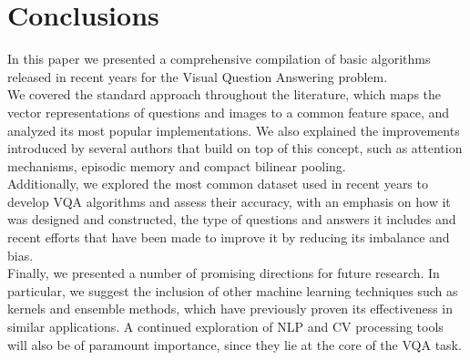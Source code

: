 \documentclass{article}
\begin{document}
\section{Conclusions}\label{conclusions}
In this paper we presented a comprehensive compilation of basic algorithms released in recent years for the Visual Question Answering problem.\\
We covered the standard approach throughout the literature, which maps the vector representations of questions and images to a common feature space, and analyzed its most popular implementations. We also explained the improvements introduced by several authors that build on top of this concept, such as attention mechanisms, episodic memory and compact bilinear pooling.\\
Additionally, we explored the most common dataset used in recent years to develop VQA algorithms and assess their accuracy, with an emphasis on how it was designed and constructed, the type of questions and answers it includes and recent efforts that have been made to improve it by reducing its imbalance and bias.\\
Finally, we presented a number of promising directions for future research. In particular, we suggest the inclusion of other machine learning techniques such as kernels and ensemble methods, which have previously proven its effectiveness in similar applications. A continued exploration of NLP and CV processing tools will also be of paramount importance, since they lie at the core of the VQA task.

\end{document}
